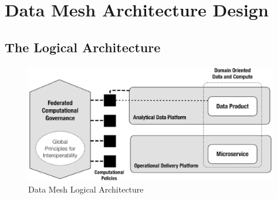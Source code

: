 \documentclass[12pt, a4paper]{book}
\begin{document}
\section{Data Mesh Architecture Design}
\subsection{The Logical Architecture}
\begin{figure}[h]
	\begin{framed}
		\centering
		\includegraphics[width=11cm]{LogicalArchitecture.png}
		\caption{Data Mesh Logical Architecture \cite{machado2022data}}
		\label{LogicalArchitecture}
	\end{framed}
\end{figure}
\end{document}
